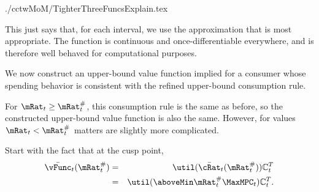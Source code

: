 \documentclass[titlepage]{\econtex}
\begin{document}
\begin{verbatimwrite}{./cctwMoM/TighterThreeFuncsExplain.tex}

This just says that, for each interval, we use the approximation that
is most appropriate.  The function is continuous and
once-differentiable everywhere, and is therefore well behaved for
computational purposes.

We now construct an upper-bound value function implied for a consumer whose spending behavior
is consistent with the refined upper-bound consumption rule.  

For $\mRat_{t} \geq \mRat_{t}^{\#}$, this consumption rule is the same as before,
so the constructed upper-bound value function is also the same.  However, for 
values $\mRat_{t} < \mRat_{t}^{\#}$ matters are slightly more complicated.  

Start with the fact that at the cusp point, 
\begin{eqnarray*}
  \bar{\vFunc}_{t}(\mtCusp) & = & \util(\bar{\cRat}_{t}(\mtCusp))\mathbb{C}_{t}^{T} \\
  &=& \util(\aboveMin \mtCusp  \MaxMPC_{t})\mathbb{C}_{t}^{T}
.
\end{eqnarray*}


\end{verbatimwrite}
\end{document}
